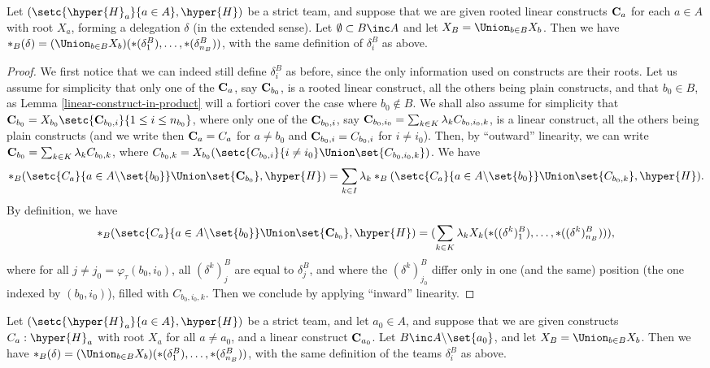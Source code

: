  
 \begin{lemma}\label{rooted-linear-construct-in-product}
Let $(\setc{\hyper{H}_a}{a\in A},\hyper{H})$ be a strict team, and suppose that we are given rooted linear constructs ${\bf C}_a$ for each $a\in A$ with root $X_a$, forming a delegation $\delta$ (in the extended sense). Let $\emptyset \subset B\inc A$ and  let $X_B=\Union_{b\in B}X_b$.  Then we have $\ast_B(\delta) =(\Union_{b\in B}X_b)(\ast(\delta^B_1),\dots,\ast(\delta^B_{n_{B}}))$, with the same 
definition of  $\delta^B_i$ as above. 
\end{lemma}
\begin{proof} We first notice that we can indeed still define $\delta_i^B$ as before, since the only information used on constructs are their roots.
Let us  assume for simplicity that only one of the ${\bf C}_a$, say ${\bf C}_{b_0}$,  is a  rooted linear construct, all the others being plain constructs,  and that $b_0\in B$,  as  Lemma \ref{linear-construct-in-product} will a fortiori cover the case where $b_0\nin B$. We shall also assume for simplicity that 
 ${\bf C}_{b_0}=X_{b_0}\setc{{\bf C}_{b_0,i}}{1\leq i \leq n_{b_0}}$, where only one of the ${\bf C}_{b_0,i}$, say 
${\bf C}_{b_0,i_0}= \sum_{k\in K}  \lambda_k C_{b_0,i_0,k} $, is a linear construct, all the others being plain constructs (and we write then
${\bf C}_a=C_a$ for $a\neq b_0$ and ${\bf C}_{b_0,i}= C_{b_0,i}$ for $i\neq i_0$). Then, by ``outward'' linearity, we can write 
${\bf C}_{b_0}=\sum_{k\in K} \lambda_k C_{b_0,k}$, where 
$C_{b_0,k}= X_{b_0}(\setc{{C}_{b_0,i}}{i\neq i_0} \Union \set{C_{b_0,i_0,k}})$. We have
$$\ast_B(\setc{C_a}{a \in A\backslash\set{b_0}}\Union 
\set{{\bf C}_{b_0}},\hyper{H})=\sum_{k\in I} \lambda_k \ast_B(\setc{C_a}{a \in A\backslash\set{b_0}}\Union 
\set{C_{b_0,k}},\hyper{H}).$$
By definition,
we have
$$\ast_B(\setc{C_a}{a \in A\backslash\set{b_0}}\Union 
\set{{\bf C}_{b_0}},\hyper{H})= (\sum_{k\in K}  \lambda_k X_k(\ast((\delta^k)^B_1),\dots,\ast((\delta^k)^B_{n_{B}}))),$$
where for all $j\neq j_0=\varphi_\tau(b_0,i_0)$, all $(\delta^k)^B_j$ are equal to $\delta^B_j$, and where the $(\delta^k)^B_{j_0}$ differ only in one (and the same) position (the one indexed by $(b_0,i_0)$), filled  with $C_{b_0,i_0,k}$. Then we conclude by  applying ``inward'' linearity.\end{proof}


\begin{lemma} \label{linear-construct-in-product}
Let $(\setc{\hyper{H}_a}{a\in A},\hyper{H})$ be a strict team, and let $a_0\in A$, and suppose that we are given constructs $C_a:\hyper{H}_a$ with root $X_a$ for all $a\neq a_0$, and a linear construct ${\bf C}_{a_0}$. Let $B\inc A\backslash\set{a_0}$, and let $X_B=\Union_{b\in B}X_b$.  
Then we have $\ast_B(\delta) =(\Union_{b\in B}X_b)(\ast(\delta^B_1),\dots,\ast(\delta^B_{n_{B}}))$, with the same 
definition of the teams $\delta^B_i$ as above. 
\end{lemma}

